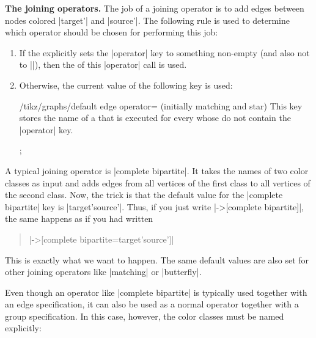 \medskip
\textbf{The joining operators.} The job of a joining operator is to add edges
between nodes colored |target'| and |source'|. The following rule is used to
determine which operator should be chosen for performing this job:
%
\begin{enumerate}
    \item If the  explicitly sets the |operator| key
        to something non-empty (and also not to |\relax|), then the 
        of this |operator| call is used.
    \item Otherwise, the current value of the following key is used:
        \begin{key}{/tikz/graphs/default edge operator= (initially matching and star)}
            This key stores the name of a  that is executed for every
             whose  do not contain the
            |operator| key.
\begin{codeexample}[]
\tikz {};
\end{codeexample}
        \end{key}
\end{enumerate}

A typical joining operator is |complete bipartite|. It takes the names of two
color classes as input and adds edges from all vertices of the first class to
all vertices of the second class. Now, the trick is that the default value for
the |complete bipartite| key is |{target'}{source'}|. Thus, if you just write
|->[complete bipartite]|, the same happens as if you had written
%
\begin{quote}
    |->[complete bipartite={target'}{source'}]|
\end{quote}
%
This is exactly what we want to happen. The same default values are also set
for other joining operators like |matching| or |butterfly|.

Even though an operator like |complete bipartite| is typically used together
with an edge specification, it can also be used as a normal operator together
with a group specification. In this case, however, the color classes must be
named explicitly:
%
\begin{codeexample}[]
\end{codeexample}

